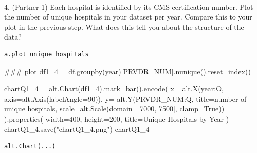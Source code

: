 \documentclass[
  letterpaper,
  DIV=11,
  numbers=noendperiod]{scrartcl}
\makeatletter
\let\oldparagraph\paragraph
\renewcommand{\paragraph}{
    \@ifstar
      \xxxParagraphStar
      \xxxParagraphNoStar
  }
\newcommand{\xxxParagraphStar}[1]{\oldparagraph*{#1}\mbox{}}
\newcommand{\xxxParagraphNoStar}[1]{\oldparagraph{#1}\mbox{}}
\newenvironment{Shaded}{\begin{snugshade}}{\end{snugshade}}
\newcommand{\CommentTok}[1]{\textcolor[rgb]{0.37,0.37,0.37}{#1}}
\newcommand{\DecValTok}[1]{\textcolor[rgb]{0.68,0.00,0.00}{#1}}
\newcommand{\NormalTok}[1]{\textcolor[rgb]{0.00,0.23,0.31}{#1}}
\newcommand{\OperatorTok}[1]{\textcolor[rgb]{0.37,0.37,0.37}{#1}}
\newcommand{\StringTok}[1]{\textcolor[rgb]{0.13,0.47,0.30}{#1}}
\newcommand{\VariableTok}[1]{\textcolor[rgb]{0.07,0.07,0.07}{#1}}
\makeatother
\begin{document}
\paragraph{4. (Partner 1) Each hospital is identified by its CMS
certification number. Plot the number of unique hospitals in your
dataset per year. Compare this to your plot in the previous step. What
does this tell you about the structure of the
data?}\label{partner-1-each-hospital-is-identified-by-its-cms-certification-number.-plot-the-number-of-unique-hospitals-in-your-dataset-per-year.-compare-this-to-your-plot-in-the-previous-step.-what-does-this-tell-you-about-the-structure-of-the-data}

\begin{verbatim}
a.plot unique hospitals
\end{verbatim}

\begin{Shaded}
\begin{Highlighting}[]
\CommentTok{\#\#\# plot}
\NormalTok{df1\_4 }\OperatorTok{=}\NormalTok{ df.groupby(}\StringTok{\textquotesingle{}year\textquotesingle{}}\NormalTok{)[}\StringTok{\textquotesingle{}PRVDR\_NUM\textquotesingle{}}\NormalTok{].nunique().reset\_index()}

\NormalTok{chartQ1\_4 }\OperatorTok{=}\NormalTok{ alt.Chart(df1\_4).mark\_bar().encode(}
\NormalTok{    x}\OperatorTok{=}\NormalTok{ alt.X(}\StringTok{\textquotesingle{}year:O\textquotesingle{}}\NormalTok{, axis}\OperatorTok{=}\NormalTok{alt.Axis(labelAngle}\OperatorTok{=}\DecValTok{90}\NormalTok{)),}
\NormalTok{    y}\OperatorTok{=}\NormalTok{ alt.Y(}\StringTok{\textquotesingle{}PRVDR\_NUM:Q\textquotesingle{}}\NormalTok{, title}\OperatorTok{=}\StringTok{\textquotesingle{}number of unique hospitals\textquotesingle{}}\NormalTok{, scale}\OperatorTok{=}\NormalTok{alt.Scale(domain}\OperatorTok{=}\NormalTok{[}\DecValTok{7000}\NormalTok{, }\DecValTok{7500}\NormalTok{], clamp}\OperatorTok{=}\VariableTok{True}\NormalTok{))}
\NormalTok{).properties(}
\NormalTok{    width}\OperatorTok{=}\DecValTok{400}\NormalTok{, }
\NormalTok{    height}\OperatorTok{=}\DecValTok{200}\NormalTok{, }
\NormalTok{    title}\OperatorTok{=}\StringTok{\textquotesingle{}Unique Hospitals by Year\textquotesingle{}}  
\NormalTok{)}
\NormalTok{chartQ1\_4.save(}\StringTok{"chartQ1\_4.png"}\NormalTok{)}
\NormalTok{chartQ1\_4}
\end{Highlighting}
\end{Shaded}

\begin{verbatim}
alt.Chart(...)
\end{verbatim}
\end{document}
